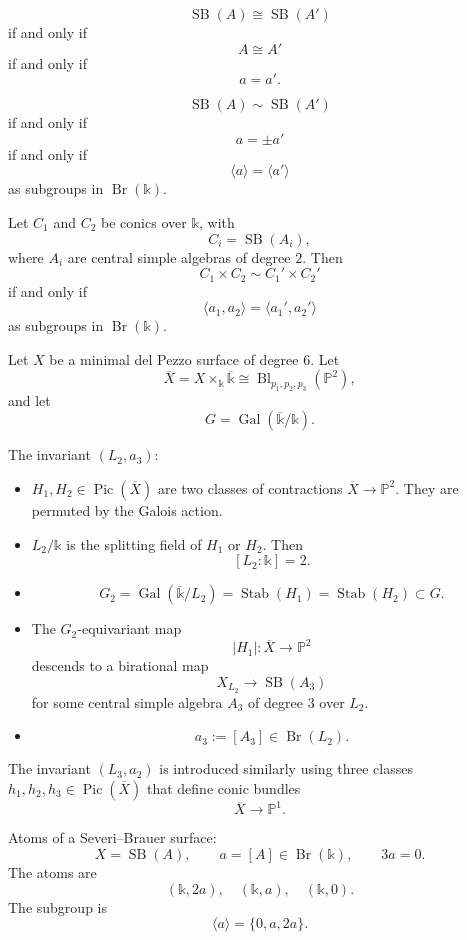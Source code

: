 $$
\operatorname{SB}(A)\cong
\operatorname{SB}(A')
$$
if and only if
$$
A\cong A'
$$
if and only if
$$
a=a'.
$$

\begin{theorem}[Amitsur]
$$
\operatorname{SB}(A)\sim
\operatorname{SB}(A')
$$
if and only if
$$
a=\pm a'
$$
if and only if
$$
\langle a\rangle=\langle a'\rangle
$$
as subgroups in $\operatorname{Br}(\mathbb
k)$.
\end{theorem}

\begin{theorem}[Koll\'ar]
Let $C_1$ and $C_2$ be conics over
$\mathbb k$, with
$$
C_i=\operatorname{SB}(A_i),
$$
where $A_i$ are central simple
algebras of degree $2$.
Then
$$
C_1\times C_2\sim C_1'\times C_2'
$$
if and only if
$$
\langle a_1,a_2\rangle
=
\langle a_1',a_2'\rangle
$$
as subgroups in $\operatorname{Br}(\mathbb
k)$.
\end{theorem}

\begin{example}
Let $X$ be a minimal del Pezzo surface
of degree $6$.
Let
$$
\overline X
=
X\times_{\mathbb k}\overline{\mathbb k}
\cong
\operatorname{Bl}_{p_1,p_2,p_3}
(\mathbb P^2),
$$
and let
$$
G=\operatorname{Gal}(
\overline{\mathbb k}/\mathbb k).
$$

The invariant $(L_2,a_3)$:
\begin{itemize}
\item $H_1,H_2\in \operatorname{Pic}
(\overline X)$ are two classes of
contractions $\overline X\to \mathbb P^2$.
They are permuted by the Galois action.
\item $L_2/\mathbb k$ is the splitting
field of $H_1$ or $H_2$.
Then
$$
[L_2:\mathbb k]=2.
$$
\item
$$
G_2=\operatorname{Gal}(
\overline{\mathbb k}/L_2)
=\operatorname{Stab}(H_1)
=\operatorname{Stab}(H_2)\subset G.
$$
\item The $G_2$-equivariant map
$$
|H_1|:\overline X\to \mathbb P^2
$$
descends to a birational map
$$
X_{L_2}\to \operatorname{SB}(A_3)
$$
for some central simple algebra $A_3$
of degree $3$ over $L_2$.
\item
$$
a_3:=[A_3]\in \operatorname{Br}(L_2).
$$
\end{itemize}

The invariant $(L_3,a_2)$ is introduced
similarly using three classes
$h_1,h_2,h_3\in \operatorname{Pic}
(\overline X)$ that define conic bundles
$$
\overline X\to \mathbb P^1.
$$
\end{example}

\begin{example}
Atoms of a Severi--Brauer surface:
$$
X=\operatorname{SB}(A),
\qquad
a=[A]\in \operatorname{Br}(\mathbb k),
\qquad
3a=0.
$$
The atoms are
$$
(\mathbb k,2a),\quad
(\mathbb k,a),\quad
(\mathbb k,0).
$$
The subgroup is
$$
\langle a\rangle=\{0,a,2a\}.
$$
\end{example}

